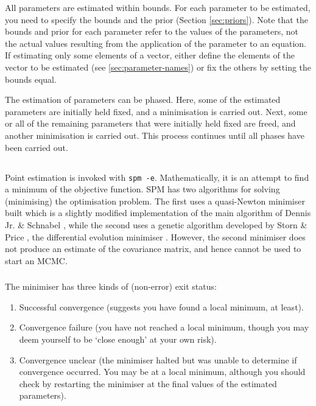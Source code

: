All parameters are estimated within bounds. For each parameter to be estimated, you need to specify the bounds and the prior (Section \ref{sec:priors}). Note that the bounds and prior for each parameter refer to the values of the parameters, not the actual values resulting from the application of the parameter to an equation. If estimating only some elements of a vector, either define the elements of the vector to be estimated (see \ref{sec:parameter-names}) or fix the others by setting the bounds equal.

The estimation of parameters can be phased. Here, some of the estimated parameters are initially held fixed, and a minimisation is carried out. Next, some or all of the remaining parameters that were initially held fixed are freed, and another minimisation is carried out. This process continues until all phases have been carried out.

\subsection{\label{sec:estimate-MPD}}

Point estimation is invoked with \texttt{spm -e}. Mathematically, it is an attempt to find a minimum of the objective function. SPM has two algorithms for solving (minimising) the optimisation problem. The first uses a quasi-Newton minimiser built which is a slightly modified implementation of the main algorithm of Dennis Jr. \& Schnabel \citep{779}, while the second uses a genetic algorithm developed by Storn \& Price \citep{1442}, the differential evolution minimiser . However, the second minimiser does not produce an estimate of the covariance matrix, and hence cannot be used to start an MCMC.

\subsubsection{}

The minimiser has three kinds of (non-error) exit status: 

\begin{enumerate}
\item Successful convergence (suggests you have found a local minimum, at least).
\item Convergence failure (you have not reached a local minimum, though you may deem yourself to be `close enough' at your own risk).
\item Convergence unclear (the minimiser halted but was unable to determine if convergence occurred. You may be at a local minimum, although you should check by restarting the minimiser at the final values of the estimated parameters).
\end{enumerate}

